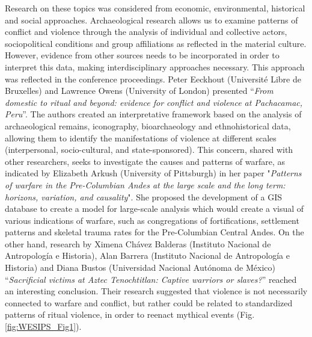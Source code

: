 Research on these topics was considered from economic, environmental, historical and social approaches. Archaeological research allows us to examine patterns of conflict and violence through the analysis of individual and collective actors, sociopolitical conditions and group affiliations as reflected in the material culture. However, evidence from other sources needs to be incorporated in order to interpret this data, making interdisciplinary approaches necessary. This approach was reflected in the conference proceedings. Peter Eeckhout (Université Libre de Bruxelles) and Lawrence Owens (University of London) presented “\textit{From domestic to ritual and beyond: evidence for conflict and violence at Pachacamac, Peru}”. The authors created an interpretative framework based on the analysis of archaeological remains, iconography, bioarchaeology and ethnohistorical data, allowing them to identify the manifestations of violence at different scales (interpersonal, socio-cultural, and state-sponsored). This concern, shared with other researchers, seeks to investigate the causes and patterns of warfare, as indicated by Elizabeth Arkush (University of Pittsburgh) in her paper "\textit{Patterns of warfare in the Pre-Columbian Andes at the large scale and the long term: horizons, variation, and causality}". She proposed the development of a GIS database to create a model for large-scale analysis which would create a visual of various indications of warfare, such as congregations of fortifications, settlement patterns and skeletal trauma rates for the Pre-Columbian Central Andes. On the other hand, research by Ximena Chávez Balderas (Instituto Nacional de Antropología e Historia), Alan Barrera (Instituto Nacional de Antropología e Historia) and Diana Bustos (Universidad Nacional Autónoma de México) “\textit{Sacrificial victims at Aztec Tenochtitlan: Captive warriors or slaves?}” reached an interesting conclusion. Their research suggested that violence is not necessarily connected to warfare and conflict, but rather could be related to standardized patterns of ritual violence, in order to reenact mythical events (Fig. \ref{fig:WESIPS_Fig1}).

